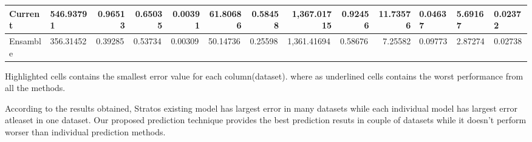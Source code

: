 \begin{table}[]
\begin{tabular}{|l|l|r|r|r|r|r|r|r|r|l|l|l|}
Current                                      & 546.93791                & 0.96513                      & 0.65035                      & 0.00391                      & 61.80686                      & 0.58458                      & 1,367.01715                      & 0.92456                      & 11.73576      & 0.04637     & 5.69167     & 0.02372    \\ \hline
Ensamble                                     & 356.31452                & \multicolumn{1}{l|}{0.39285} & \multicolumn{1}{l|}{0.53734} & \multicolumn{1}{l|}{0.00309} & \multicolumn{1}{l|}{50.14736} & \multicolumn{1}{l|}{0.25598} & \multicolumn{1}{l|}{1,361.41694} & \multicolumn{1}{l|}{0.58676} & 7.25582       & 0.09773     & 2.87274     & 0.02738    \\ \hline
\end{tabular}
\end{table}

Highlighted cells contains the smallest error value for each column(dataset). where as underlined cells contains the worst performance from all the methods. 

According to the results obtained, Stratos existing model has largest error in many datasets while each individual model has largest error atleaset in one dataset. Our proposed prediction technique provides the best prediction resuts in couple of datasets while it doesn't perform worser than individual prediction methods. 
